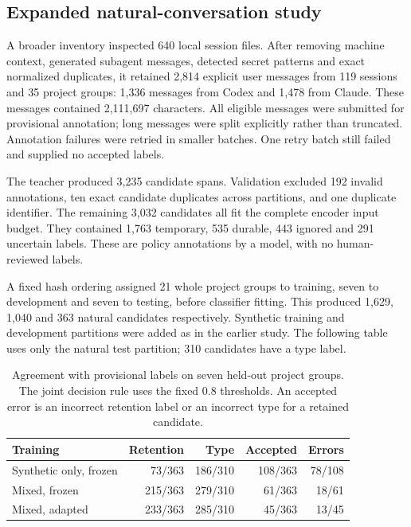 \subsection{Expanded natural-conversation study}
A broader inventory inspected 640 local session files. After removing machine
context, generated subagent messages, detected secret patterns and exact
normalized duplicates, it retained 2,814 explicit user messages from 119 sessions
and 35 project groups: 1,336 messages from Codex and 1,478 from Claude. These
messages contained 2,111,697 characters. All eligible messages were submitted
for provisional annotation; long messages were split explicitly rather than
truncated. Annotation failures were retried in smaller batches. One retry batch
still failed and supplied no accepted labels.

The teacher produced 3,235 candidate spans. Validation excluded 192 invalid
annotations, ten exact candidate duplicates across partitions, and one duplicate
identifier. The remaining 3,032 candidates all fit the complete encoder input
budget. They contained 1,763 temporary, 535 durable, 443 ignored and 291 uncertain
labels. These are policy annotations by a model, with no human-reviewed labels.

A fixed hash ordering assigned 21 whole project groups to training, seven to
development and seven to testing, before classifier fitting. This produced
1,629, 1,040 and 363 natural candidates respectively. Synthetic training and
development partitions were added as in the earlier study. The following table
uses only the natural test partition; 310 candidates have a type label.

\begin{table}[htbp]
\centering
\begin{tabular}{lrrrr}
\toprule
Training & Retention & Type & Accepted & Errors\\
\midrule
Synthetic only, frozen & 73/363 & 186/310 & 108/363 & 78/108\\
Mixed, frozen & 215/363 & 279/310 & 61/363 & 18/61\\
Mixed, adapted & 233/363 & 285/310 & 45/363 & 13/45\\
\bottomrule
\end{tabular}
\caption{Agreement with provisional labels on seven held-out project groups.
The joint decision rule uses the fixed 0.8 thresholds. An accepted error is an
incorrect retention label or an incorrect type for a retained candidate.}
\label{tab:expanded-classification}
\end{table}

